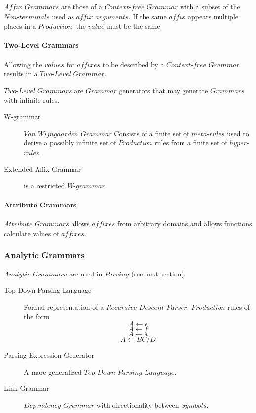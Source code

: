 \documentclass{article}
\begin{document}
    $Affix$ $Grammars$ are those of a $Context$-$free$ $Grammar$ with
    a subset of the $Non$-$terminals$ used as $affix$ $arguments$. If
    the same $affix$ appears multiple places in a $Production$, the
    $value$ must be the same.

    \paragraph{Two-Level Grammars}
    Allowing the $values$ for $affixes$ to be described by a
    $Context$-$free$ $Grammar$ results in a $Two$-$Level$ $Grammar$.

    $Two$-$Level$ $Grammars$ are $Grammar$ generators that may
    generate $Grammars$ with infinite rules.

    \begin{description}
    \item[W-grammar] $Van$ $Wijngaarden$ $Grammar$
    Consists of a finite set of $meta$-$rules$ used to derive a
    possibly infinite set of $Production$ rules from a finite set of
    $hyper$-$rules$.
    \item[Extended Affix Grammar] is a restricted $W$-$grammar$.
    \end{description}

    \paragraph{Attribute Grammars}
    $Attribute$ $Grammars$ allows $affixes$ from arbitrary domains and
    allows functions calculate values of $affixes$.

\subsubsection{Analytic Grammars}

    $Analytic$ $Grammars$ are used in $Parsing$ (see next section).

    \begin{description}
    \item[Top-Down Parsing Language] Formal representation of a
      $Recursive$ $Descent$ $Parser$. $Production$ rules of the form
    \[
        A \leftarrow \epsilon
    \]\[
        A \leftarrow f
    \]\[
        A \leftarrow a
    \]\[
        A \leftarrow BC/D
    \]
    \item[Parsing Expression Generator]
    A more generalized $Top$-$Down$ $Parsing$ $Language$.
    \item[Link Grammar]
    $Dependency$ $Grammar$ with directionality between $Symbols$.
    \end{description}
\end{document}
